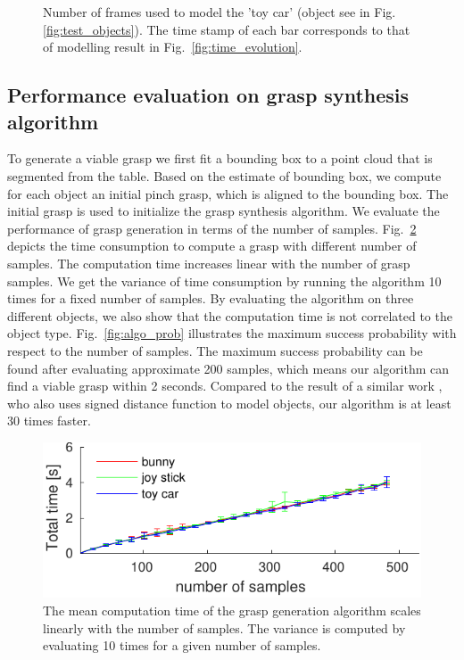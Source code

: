 \begin{figure}[!htbp]
\centering
\def\svgwidth{0.7\linewidth}

\caption{Number of frames used to model the 'toy car' (object see in Fig.~ \ref{fig:test_objects}). The time stamp of each bar corresponds to that of modelling result in Fig.~\ref{fig:time_evolution}.}
\label{fig:numberofframes}
\end{figure}

\subsection{Performance evaluation on grasp synthesis algorithm}
To generate a viable grasp we first fit a bounding box to a point cloud that is segmented from the table. Based on the estimate of bounding box, we compute for each object an initial pinch grasp, which is aligned to the bounding box. The initial grasp is used
to initialize the grasp synthesis algorithm. We evaluate the performance of grasp generation in terms of the number of samples. Fig.~\ref{fig:algo_runtime} depicts the time consumption to compute a grasp with different number of samples. The computation time increases linear with the number of grasp samples. We get the variance of time consumption by running the algorithm 10 times for a fixed number of samples. By evaluating the algorithm on three different objects, we also show that the computation time is not correlated to the object type. Fig.~\ref{fig:algo_prob} illustrates the maximum success probability with respect to the number of samples. The maximum success probability can be found after evaluating approximate 200 samples, which means our algorithm can find a viable grasp within 2 seconds. Compared to the result of a similar work , who also uses signed distance function to model objects, our algorithm is at least 30 times faster.

\begin{figure}[!htpb]
\centering
\includegraphics[width=0.7\linewidth]{figure/algo_runtime2-crop.pdf}
\caption{The mean computation time of the grasp generation algorithm scales linearly with the number of samples. The variance is computed by evaluating 10 times for a given number of samples.}
\label{fig:algo_runtime}
\end{figure}


